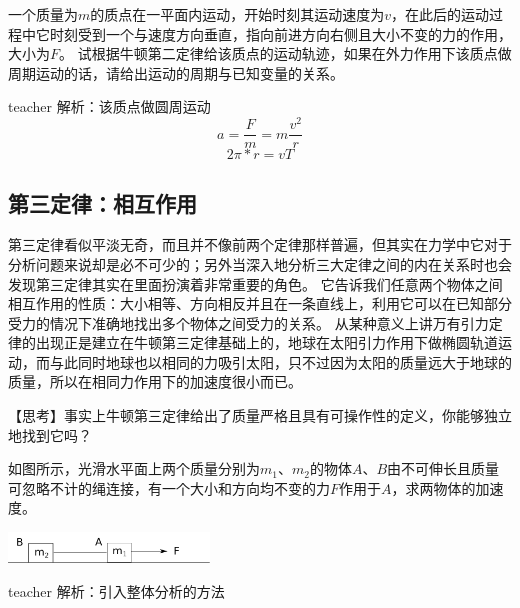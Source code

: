 \begin{example}
	一个质量为$m$的质点在一平面内运动，开始时刻其运动速度为$v$，在此后的运动过程中它时刻受到一个与速度方向垂直，指向前进方向右侧且大小不变的力的作用，大小为$F$。
	试根据牛顿第二定律给该质点的运动轨迹，如果在外力作用下该质点做周期运动的话，请给出运动的周期与已知变量的关系。
	\begin{taggedblock}{teacher}
\newline
		解析：该质点做圆周运动
		\[a=\frac{F}{m}=m\frac{v^2}{r}\]
		\[2\pi*r=vT\]
	\end{taggedblock}
\end{example}






\subsection{第三定律：相互作用}
第三定律看似平淡无奇，而且并不像前两个定律那样普遍，但其实在力学中它对于分析问题来说却是必不可少的；另外当深入地分析三大定律之间的内在关系时也会发现第三定律其实在里面扮演着非常重要的角色。
它告诉我们任意两个物体之间相互作用的性质：大小相等、方向相反并且在一条直线上，利用它可以在已知部分受力的情况下准确地找出多个物体之间受力的关系。
从某种意义上讲万有引力定律的出现正是建立在牛顿第三定律基础上的，地球在太阳引力作用下做椭圆轨道运动，而与此同时地球也以相同的力吸引太阳，只不过因为太阳的质量远大于地球的质量，所以在相同力作用下的加速度很小而已。

【思考】事实上牛顿第三定律给出了质量严格且具有可操作性的定义，你能够独立地找到它吗？

\begin{example}
	如图所示，光滑水平面上两个质量分别为$m_1$、$m_2$的物体$A、B$由不可伸长且质量可忽略不计的绳连接，有一个大小和方向均不变的力$F$作用于$A$，求两物体的加速度。
	\begin{flushright}
		\includegraphics[width = 0.4\textwidth]{images/newton-11.pdf} 
	\end{flushright}
	\begin{taggedblock}{teacher}
		\noindent
		解析：引入整体分析的方法
	\end{taggedblock}
\end{example}

